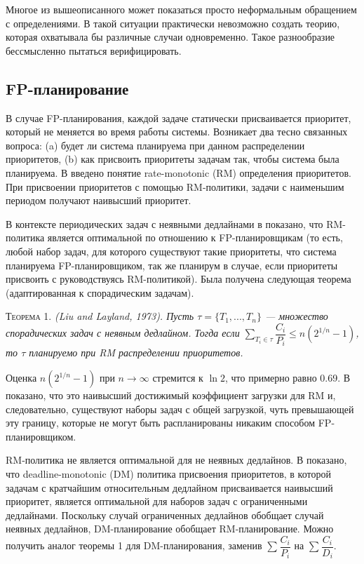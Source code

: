 \documentclass[14pt]{matmex-diploma-custom}
\begin{document}
Многое из вышеописанного может показаться просто неформальным обращением с определениями. 
  В такой ситуации практически невозможно создать теорию, которая охватывала бы 
  различные случаи одновременно. Такое разнообразие бессмысленно пытаться верифицировать.

\subsection{FP-планирование}

В случае FP-планирования, каждой задаче статически присваивается приоритет, который не меняется во время работы системы. Возникает два тесно связанных вопроса: (a) будет ли система планируема при данном распределении приоритетов, (b) как присвоить приоритеты задачам так, чтобы система была планируема. В \cite{Liu1973SchedulingAF} введено понятие rate-monotonic (RM) определения приоритетов. При присвоении приоритетов с помощью RM-политики, задачи с наименьшим периодом получают наивысший приоритет.


В контексте периодических задач с неявными дедлайнами в \cite{Liu1973SchedulingAF} показано, что RM-политика является оптимальной по отношению к FP-планировщикам (то есть, любой набор задач, для которого существуют такие приоритеты, что система планируема FP-планировщиком, так же планирум в случае, если приоритеты присвоить с руководствуясь RM-политикой). Была получена следующая теорема (адаптированная к спорадическим задачам).
 
\textsc{Теорема 1. }
\textit{(Liu and Layland, 1973). Пусть $\tau = \{T_1, ... , T_n\}$ --- множество спорадических задач с неявным дедлайном. Тогда если $\sum_{T_i \in \tau} \dfrac{C_i}{P_i} \leq n(2^{1/n} - 1)$, то $\tau$ планируемо при RM распределении приоритетов.
}

Оценка $n(2^{1/n} - 1)$ при $n \rightarrow \infty$ стремится к $\ln 2$, что примерно равно 0.69. В \cite{Liu1973SchedulingAF} показано, что это наивысший достижимый коэффициент загрузки для RM и, следовательно, существуют наборы задач с общей загрузкой, чуть превышающей эту границу, которые не могут быть распланированы никаким способом FP-планировщиком. 

RM-политика не является оптимальной для не неявных дедлайнов. В \cite{LEUNG1982237} показано, что deadline-monotonic (DM) политика присвоения приоритетов, в которой задачам с кратчайшим относительным дедлайном присваивается наивысший приоритет, является оптимальной для наборов задач с ограниченными дедлайнами. Поскольку случай ограниченных дедлайнов обобщает случай неявных дедлайнов, DM-планирование обобщает RM-планирование. Можно получить аналог теоремы 1 для DM-планирования, заменив $\sum_{} \dfrac{C_i}{P_i}$ на $\sum_{} \dfrac{C_i}{D_i}$. 
\end{document}

